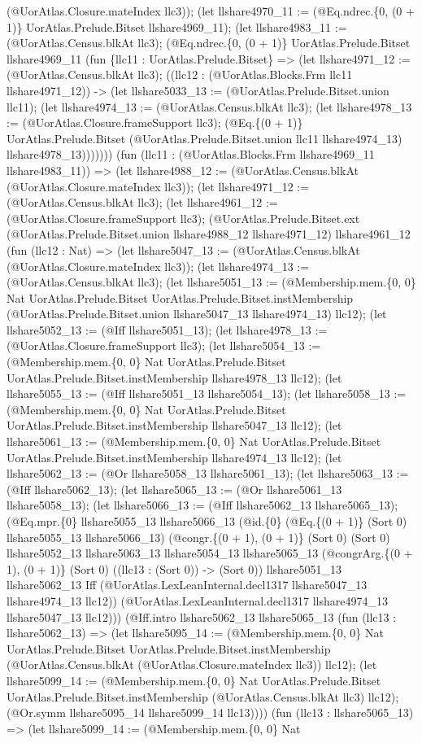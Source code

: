 \documentclass[11pt]{article}
\begin{document}
(@UorAtlas.Closure.mateIndex llc3)); (let llshare4970\_11 := (@Eq.ndrec.\{0, (0 + 1)\} UorAtlas.Prelude.Bitset llshare4969\_11); (let llshare4983\_11 := (@UorAtlas.Census.blkAt llc3); (@Eq.ndrec.\{0, (0 + 1)\} UorAtlas.Prelude.Bitset llshare4969\_11 (fun \{llc11 : UorAtlas.Prelude.Bitset\} => (let llshare4971\_12 := (@UorAtlas.Census.blkAt llc3); ((llc12 : (@UorAtlas.Blocks.Frm llc11 llshare4971\_12)) -> (let llshare5033\_13 := (@UorAtlas.Prelude.Bitset.union llc11); (let llshare4974\_13 := (@UorAtlas.Census.blkAt llc3); (let llshare4978\_13 := (@UorAtlas.Closure.frameSupport llc3); (@Eq.\{(0 + 1)\} UorAtlas.Prelude.Bitset (@UorAtlas.Prelude.Bitset.union llc11 llshare4974\_13) llshare4978\_13))))))) (fun (llc11 : (@UorAtlas.Blocks.Frm llshare4969\_11 llshare4983\_11)) => (let llshare4988\_12 := (@UorAtlas.Census.blkAt (@UorAtlas.Closure.mateIndex llc3)); (let llshare4971\_12 := (@UorAtlas.Census.blkAt llc3); (let llshare4961\_12 := (@UorAtlas.Closure.frameSupport llc3); (@UorAtlas.Prelude.Bitset.ext (@UorAtlas.Prelude.Bitset.union llshare4988\_12 llshare4971\_12) llshare4961\_12 (fun (llc12 : Nat) => (let llshare5047\_13 := (@UorAtlas.Census.blkAt (@UorAtlas.Closure.mateIndex llc3)); (let llshare4974\_13 := (@UorAtlas.Census.blkAt llc3); (let llshare5051\_13 := (@Membership.mem.\{0, 0\} Nat UorAtlas.Prelude.Bitset UorAtlas.Prelude.Bitset.instMembership (@UorAtlas.Prelude.Bitset.union llshare5047\_13 llshare4974\_13) llc12); (let llshare5052\_13 := (@Iff llshare5051\_13); (let llshare4978\_13 := (@UorAtlas.Closure.frameSupport llc3); (let llshare5054\_13 := (@Membership.mem.\{0, 0\} Nat UorAtlas.Prelude.Bitset UorAtlas.Prelude.Bitset.instMembership llshare4978\_13 llc12); (let llshare5055\_13 := (@Iff llshare5051\_13 llshare5054\_13); (let llshare5058\_13 := (@Membership.mem.\{0, 0\} Nat UorAtlas.Prelude.Bitset UorAtlas.Prelude.Bitset.instMembership llshare5047\_13 llc12); (let llshare5061\_13 := (@Membership.mem.\{0, 0\} Nat UorAtlas.Prelude.Bitset UorAtlas.Prelude.Bitset.instMembership llshare4974\_13 llc12); (let llshare5062\_13 := (@Or llshare5058\_13 llshare5061\_13); (let llshare5063\_13 := (@Iff llshare5062\_13); (let llshare5065\_13 := (@Or llshare5061\_13 llshare5058\_13); (let llshare5066\_13 := (@Iff llshare5062\_13 llshare5065\_13); (@Eq.mpr.\{0\} llshare5055\_13 llshare5066\_13 (@id.\{0\} (@Eq.\{(0 + 1)\} (Sort 0) llshare5055\_13 llshare5066\_13) (@congr.\{(0 + 1), (0 + 1)\} (Sort 0) (Sort 0) llshare5052\_13 llshare5063\_13 llshare5054\_13 llshare5065\_13 (@congrArg.\{(0 + 1), (0 + 1)\} (Sort 0) ((llc13 : (Sort 0)) -> (Sort 0)) llshare5051\_13 llshare5062\_13 Iff (@UorAtlas.LexLeanInternal.decl1317 llshare5047\_13 llshare4974\_13 llc12)) (@UorAtlas.LexLeanInternal.decl1317 llshare4974\_13 llshare5047\_13 llc12))) (@Iff.intro llshare5062\_13 llshare5065\_13 (fun (llc13 : llshare5062\_13) => (let llshare5095\_14 := (@Membership.mem.\{0, 0\} Nat UorAtlas.Prelude.Bitset UorAtlas.Prelude.Bitset.instMembership (@UorAtlas.Census.blkAt (@UorAtlas.Closure.mateIndex llc3)) llc12); (let llshare5099\_14 := (@Membership.mem.\{0, 0\} Nat UorAtlas.Prelude.Bitset UorAtlas.Prelude.Bitset.instMembership (@UorAtlas.Census.blkAt llc3) llc12); (@Or.symm llshare5095\_14 llshare5099\_14 llc13)))) (fun (llc13 : llshare5065\_13) => (let llshare5099\_14 := (@Membership.mem.\{0, 0\} Nat 
\end{document}
